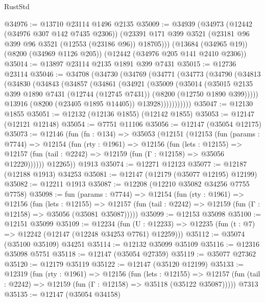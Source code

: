 \begin{lexlean}{RustStd}
\begin{coremodule}
@34976 := @13710 @23114 @1496 @2135
@35009 := @34939
    (@34973
      (@12442 (@34976 @307 @142 @7435 @2306))
      (@23391 @171 @399 @3521 (@23181 @96 @399 @96 @3521 (@12553 (@23186 @96)) @18705)))
    (@13684 (@34965 @19))
    (@8200 (@34969 @1126 @205))
    (@12442 (@34976 @205 @141 @2410 @2306))
@35014 := @13897 @23114 @2135 @1891 @399 @7431
@35015 := @12736 @23114
@35046 := @34708
    (@34730
      (@34769
        (@34771
          (@34773
            (@34790
              (@34813
                (@34830
                  (@34843
                    (@34857
                      (@34861
                        (@34921
                          (@35009
                            (@35014
                              (@35015
                                @2135
                                @399
                                @1890
                                @7431
                                (@12744 (@12745 @7431))
                                (@8200 (@12750 @1890 @399)))))
                          @13916
                          (@8200 (@23405 @1895 @14405))
                          @13928)))))))))))
@35047 := @12130 @1855
@35051 := @12132 (@12136 @1855) (@12142 @1855)
@35053 := @12147 (@12121 @12148)
@35054 := @7751 @11106
@35056 := @12147 (@35054 @12175)
@35073 := @12146
    (fun (fn : @134) =>
    @35053
      (@12151
        (@12153
          (fun (params : @7744) =>
          @12154
            (fun (rty : @1961) =>
            @12156
              (fun (lets : @12155) =>
              @12157 (fun (tail : @2242) => @12159 (fun (Γ : @12158) => @35056 @12220))))))
        @12265))
    @1913
@35074 := @12271 @12123
@35077 := @12187 (@12188 @1913) @34253
@35081 := @12147 (@12179 (@35077 @12195) @12199)
@35082 := @12211 @1913
@35087 := @12208 (@12210 @35082 @34256 @7755 @7758)
@35098 := fun (params : @7744) =>
  @12154
    (fun (rty : @1961) =>
    @12156
      (fun (lets : @12155) =>
      @12157 (fun (tail : @2242) => @12159 (fun (Γ : @12158) => @35056 (@35081 @35087)))))
@35099 := @12153 @35098
@35100 := @12151 @35099
@35109 := @12234
    (fun (U : @12233) => @12235 (fun (t : @7) => @12242 (@12147 (@12248 @34253 @7761) @12259)))
@35112 := @35074 (@35100 @35109) @34251
@35114 := @12132 @35099 @35109
@35116 := @12316 @35098 @5751
@35118 := @12147 (@35054 @27359)
@35119 := @35077 @27362
@35120 := @12179 @35119
@35122 := @12147 (@35120 @12199)
@35133 := @12319
    (fun (rty : @1961) =>
    @12156
      (fun (lets : @12155) =>
      @12157 (fun (tail : @2242) => @12159 (fun (Γ : @12158) => @35118 (@35122 @35087)))))
    @7313
@35135 := @12147 (@35054 @34158)

\end{coremodule}
\end{lexlean}
